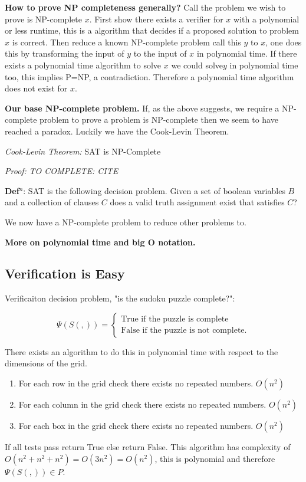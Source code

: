 \documentclass[a4paper,12pt]{article}
\begin{document}
\textbf{How to prove NP completeness generally?}
Call the problem we wish to prove is NP-complete $x$. First show there exists a verifier for $x$ with a polynomial or less runtime, this is a algorithm that decides if a proposed solution to problem $x$  is correct. Then reduce a known NP-complete problem call this $y$ to $x$, one does this by transforming the input of $y$ to the input of $x$ in polynomial time. If there exists a polynomial time algorithm to solve $x$ we could solve$y$ in polynomial time too, this implies P=NP, a contradiction. Therefore a polynomial time algorithm does not exist for $x$.

\textbf{Our base NP-complete problem.} If, as the above suggests, we require a NP-complete problem to prove a problem is NP-complete then we seem to have reached a paradox. Luckily we have the Cook-Levin Theorem.

\textit{Cook-Levin Theorem:} SAT is NP-Complete
	
\textit{Proof:}	 \textit{TO COMPLETE: CITE }

\textbf{Def$^n$}: SAT is the following decision problem. Given a set of boolean variables $B$ and a collection of clauses $C$ does a valid truth assignment exist that satisfies $C$?

We now have a NP-complete problem to reduce other problems to.

\textbf{More on polynomial time and big O notation.} 

\subsection{Verification is Easy}
Verificaiton decision problem, "is the sudoku puzzle complete?":

		\begin{equation}
			\Psi(S(,)) = \begin{cases}	
				\text{True if the puzzle is complete} \\
				\text{False if the puzzle is not complete}.
			\end{cases}
		\end{equation}

There exists an algorithm to do this in polynomial time with respect to the dimensions of the grid. 
\begin{enumerate}
\item For each row in the grid check there exists no repeated numbers. $O(n^2)$
\item For each column in the grid check there exists no repeated numbers. $O(n^2)$
\item For each box in the grid check there exists no repeated numbers. $O(n^2)$
\end{enumerate}
If all tests pass return True else return False.
This algorithm has complexity of $O(n^2 + n^2 + n^2) = O(3n^2) = O(n^2)$, this is polynomial and therefore $\Psi(S(,)) \in P$.
\end{document}
